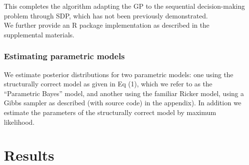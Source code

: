 \documentclass[author-year, review]{elsarticle} %
\newenvironment{Shaded}{}{}
\newcommand{\KeywordTok}[1]{\textcolor[rgb]{0.00,0.44,0.13}{\textbf{{#1}}}}
\newcommand{\DataTypeTok}[1]{\textcolor[rgb]{0.56,0.13,0.00}{{#1}}}
\newcommand{\DecValTok}[1]{\textcolor[rgb]{0.25,0.63,0.44}{{#1}}}
\newcommand{\StringTok}[1]{\textcolor[rgb]{0.25,0.44,0.63}{{#1}}}
\newcommand{\CommentTok}[1]{\textcolor[rgb]{0.38,0.63,0.69}{\textit{{#1}}}}
\newcommand{\NormalTok}[1]{{#1}}
\begin{document}
\begin{Shaded}
\end{Shaded}

This completes the algorithm adapting the GP to the sequential
decision-making problem through SDP, which has not been previously
demonstrated.\\We further provide an R package implementation as
described in the supplemental materials.

\subsubsection{Estimating parametric
models}\label{estimating-parametric-models}

We estimate posterior distributions for two parametric models: one using
the structurally correct model as given in Eq (1), which we refer to as
the ``Parametric Bayes'' model, and another using the familiar Ricker
model, using a Gibbs sampler as described (with source code) in the
appendix). In addition we estimate the parameters of the structurally
correct model by maximum likelihood.

\section{Results}\label{results-1}
\end{document}

